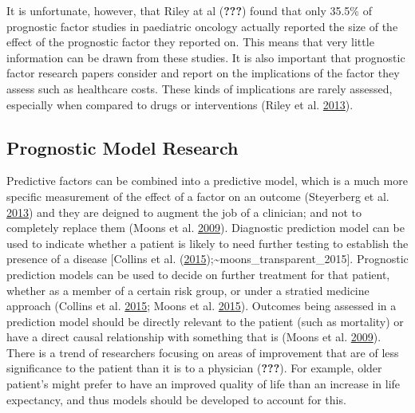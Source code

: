 \documentclass[
]{article}
\begin{document}
It is unfortunate, however, that Riley at al ({\textbf{???}}) found that only 35.5\% of prognostic factor studies in paediatric oncology actually reported the size of the effect of the prognostic factor they reported on. This means that very little information can be drawn from these studies. It is also important that prognostic factor research papers consider and report on the implications of the factor they assess such as healthcare costs. These kinds of implications are rarely assessed, especially when compared to drugs or interventions (Riley et al. \protect\hyperlink{ref-riley_prognosis_2013}{2013}).

\hypertarget{prognostic-model-research}{%
\subsection{Prognostic Model Research}\label{prognostic-model-research}}

Predictive factors can be combined into a predictive model, which is a much more specific measurement of the effect of a factor on an outcome (Steyerberg et al. \protect\hyperlink{ref-steyerberg_prognosis_2013}{2013}) and they are deigned to augment the job of a clinician; and not to completely replace them (Moons et al. \protect\hyperlink{ref-moons_prognosis_2009}{2009}). Diagnostic prediction model can be used to indicate whether a patient is likely to need further testing to establish the presence of a disease {[}Collins et al. (\protect\hyperlink{ref-collins_transparent_2015}{2015});\textasciitilde moons\_transparent\_2015{]}. Prognostic prediction models can be used to decide on further treatment for that patient, whether as a member of a certain risk group, or under a stratied medicine approach (Collins et al. \protect\hyperlink{ref-collins_transparent_2015}{2015}; Moons et al. \protect\hyperlink{ref-moons_transparent_2015}{2015}). Outcomes being assessed in a prediction model should be directly relevant to the patient (such as mortality) or have a direct causal relationship with something that is (Moons et al. \protect\hyperlink{ref-moons_prognosis_2009}{2009}). There is a trend of researchers focusing on areas of improvement that are of less significance to the patient than it is to a physician ({\textbf{???}}). For example, older patient's might prefer to have an improved quality of life than an increase in life expectancy, and thus models should be developed to account for this.
\end{document}
